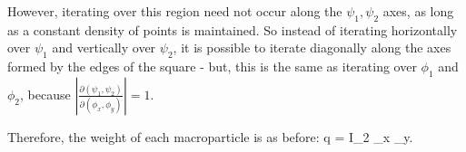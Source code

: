 However, iterating over this region need not occur along the $\psi_1,\psi_2$ axes, as long as a constant density of points is maintained.  So instead of iterating horizontally over $\psi_1$ and vertically over $\psi_2$, it is possible to iterate diagonally along the axes formed by the edges of the square - but, this is the same as iterating over $\phi_1$ and $\phi_2$, because $\left\vert\frac{\partial(\psi_1,\psi_2)}{\partial(\phi_x,\phi_y)}\right\vert = 1$.

Therefore, the weight of each macroparticle is as before:
\Begineq
	q =  \Delta I_2 \Delta \phi_x \Delta \phi_y.
\Endeq